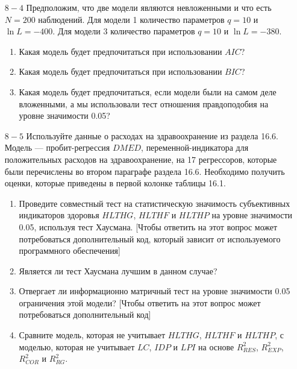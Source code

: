 \begin{enumerate}
\begin{enumerate}
\end{enumerate}
\item [$8 - 4$] Предположим, что две модели являются невложенными и что есть $N = 200$ наблюдений. Для модели 1 количество параметров $q = 10$ и $\ln L = - 400$. Для модели 3 количество параметров $q = 10$ и $\ln L = - 380$.
\begin{enumerate}
\item Какая модель будет предпочитаться при использовании $AIC$?
\item Какая модель будет предпочитаться при использовании $BIC$?
\item Какая модель будет предпочитаться, если модели были на самом деле вложенными, а мы использовали тест отношения правдоподобия на уровне значимости 0.05?
\end{enumerate}
\item [$8 - 5$] Используйте данные о расходах на здравоохранение из раздела 16.6. Модель --- пробит-регрессия $DMED$, переменной-индикатора для положительных расходов на здравоохранение, на 17 регрессоров, которые были перечислены во втором параграфе раздела 16.6. Необходимо получить оценки, которые приведены в первой колонке таблицы 16.1.
\begin{enumerate}
\item Проведите совместный тест на статистическую значимость субъективных индикаторов  здоровья $HLTHG$, $HLTHF$ и $HLTHP$ на уровне значимости 0.05, используя тест Хаусмана. [Чтобы ответить на этот вопрос может потребоваться дополнительный код, который зависит от используемого программного обеспечения]
\item Является ли тест Хаусмана лучшим в данном случае?
\item Отвергает ли информационно матричный тест на уровне значимости 0.05 ограничения этой модели? [Чтобы ответить на этот вопрос может потребоваться дополнительный код]
\item Сравните модель, которая не учитывает $HLTHG$, $HLTHF$ и $HLTHP$, с моделью, которая не учитывает $LC$, $IDP$ и $LPI$ на основе $R_{RES}^2$, $R_{EXP}^2$, $R_{COR}^2$ и $R_{RG}^2$.
\end{enumerate}
\end{enumerate}


